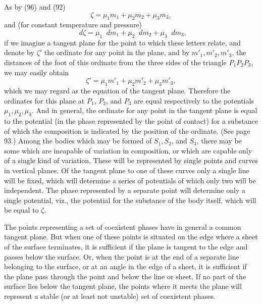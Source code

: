 \documentclass[11pt]{article}
\newcommand{\dd}{\mathop{}\!d}
\begin{document}
As by (96) and (92)
\[
\zeta=\mu_1m_1+\mu_2m_2+\mu_3m_3,
\]
and (for constant temperature and pressure)
\[
\dd\zeta=\mu_1\dd m_1+\mu_2\dd m_2+\mu_3\dd m_3,
\]
if we imagine a tangent plane for the point to which these letters relate, and denote by $\zeta'$ the ordinate for any point in the plane, and by $m'_1,m'_2,m'_3$, the distances of the foot of this ordinate from the three sides of the triangle $P_1P_2P_3$, we may easily obtain
\begin{equation}\label{eq:gibbs-v1-p3-199}
\zeta'=\mu_1m'_1+\mu_2m'_2+\mu_3m'_3, \tag{199}
\end{equation}
which we may regard as the equation of the tangent plane. Therefore the ordinates for this plane at $P_1$, $P_2$, and $P_3$ are equal respectively to the potentials $\mu_1,\mu_2,\mu_3$. And in general, the ordinate for any point in the tangent plane is equal to the potential (in the phase represented by the point of contact) for a substance of which the composition is indicated by the position of the ordinate. (See page 93.) Among the bodies which may be formed of $S_1,S_2$, and $S_3$, there may be some which are incapable of variation in composition, or which are capable only of a single kind of variation. These will be represented by single points and curves in vertical planes. Of the tangent plane to one of these curves only a single line will be fixed, which will determine a series of potentials of which only two will be independent. The phase represented by a separate point will determine only a single potential, viz., the potential for the substance of the body itself, which will be equal to $\zeta$.

The points representing a set of coexistent phases have in general a common tangent plane. But when one of these points is situated on the edge where a sheet of the surface terminates, it is sufficient if the plane is tangent to the edge and passes below the surface. Or, when the point is at the end of a separate line belonging to the surface, or at an angle in the edge of a sheet, it is sufficient if the plane pass through the point and below the line or sheet. If no part of the surface lies below the tangent plane, the points where it meets the plane will represent a stable (or at least not unstable) set of coexistent phases.
\end{document}

